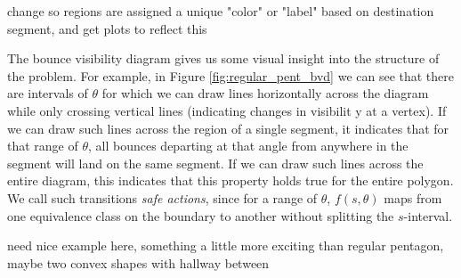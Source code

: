 \documentclass[]{svproc}  %
\begin{document}
{\color{red} change so regions are assigned a unique "color" or "label" based on
destination segment, and get plots to reflect this}

The bounce visibility diagram gives us some visual insight into the structure of
the problem. For example, in Figure \ref{fig:regular_pent_bvd} we can see that
there are intervals of $\theta$ for which we can draw lines horizontally across
the diagram while only crossing vertical lines (indicating changes in visibilit
y at a vertex). If we can draw such lines across the region of a single
segment, it indicates that for that range of $\theta$, all bounces departing at
that angle from anywhere in the segment will land on the same segment. If we can
draw such lines across the entire diagram, this indicates that this property
holds true for the entire polygon. We call such transitions \emph{safe
actions}, since for a range of $\theta$, $f(s,\theta)$ maps from one equivalence
class on the boundary to another without splitting the $s$-interval.

{\color{red} need nice example here, something a little more exciting than
regular pentagon, maybe two convex shapes with hallway between}
\end{document}
